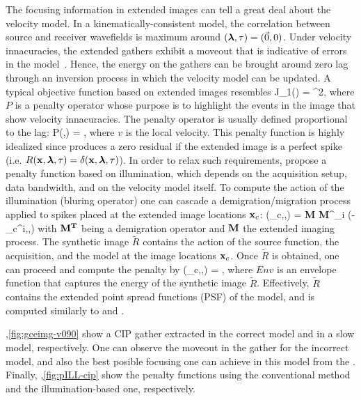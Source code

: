The focusing  information in extended images can 
tell a great deal about the velocity model. In a kinematically-consistent 
model, the correlation between source and receiver wavefields is 
maximum around $({\boldsymbol{\lambda}},\tau)=(\vec{0},0)$. Under velocity innacuracies, the
extended gathers exhibit a moveout that is indicative of 
 errors in the model~\citep{YangSava:moveout}. Hence,
 the energy on the gathers can be brought around zero lag through an
inversion process in which the velocity model can be updated. A typical 
objective function \citep{ShenSymes.geo.2008,Wiktor,tony:gp15} based on 
extended images resembles 
\beq
 J_1(\m) = ^2,
\eeq
where $P$ is a penalty operator whose purpose is to 
highlight the events in the image that show velocity innacuracies. 
 The penalty operator is usually defined proportional 
to the lag:
\beq
  P(\hh,\tau) = ,
\eeq
where $v$ is the local velocity. This penalty function is 
highly idealized since produces a zero residual if the 
extended image is a perfect spike (i.e. $R({\bf x},{\boldsymbol{\lambda}},\tau)=\delta({\bf x},{\boldsymbol{\lambda}},\tau)$).
 In order to relax such requirements, \cite{tony_seg:cwp12} propose
a penalty function based on illumination, which depends on the 
acquisition setup, data bandwidth, and on the velocity model itself. 
 To compute the action of the illumination (bluring  
operator) one can cascade a demigration/migration process 
applied to spikes placed at the extended image locations ${\bf x}_c$:
\beq
  (\xx_c,\hh,\tau) = {\bf M} {\bf M}^\top \sum_{i} \delta(\xx-\xx_c^i,\hh,\tau)
\eeq
with $\bf M^T$ being a demigration operator and $\bf M$ the extended imaging process. 
 The synthetic image $\tilde{R}$ contains the action of the source function, the acquisition, 
and the model at the image locations ${\bf x}_c$. Once $\tilde{R}$ is obtained, one can 
proceed and compute the penalty by 
\beq
  (\xx_c,\hh,\tau) = ,
\eeq
where $Env$ is an envelope function that captures the energy of the synthetic  
image $\tilde{R}$.
Effectively, $\tilde{R}$ contains the extended point spread functions (PSF) of the model, 
and is computed similarly to \cite{valenciano:2009} and \cite{FletcherLSM}.

,\ref{fig:gceimg-v090} show a CIP gather extracted in the 
correct model and in a slow model, respectively. One can observe the moveout in the gather for the
incorrect model, and also the best posible focusing one can achieve in this model from the . 
Finally, ,\ref{fig:pILL-cip} show the penalty functions using the conventional
method and the illumination-based one, respectively.

